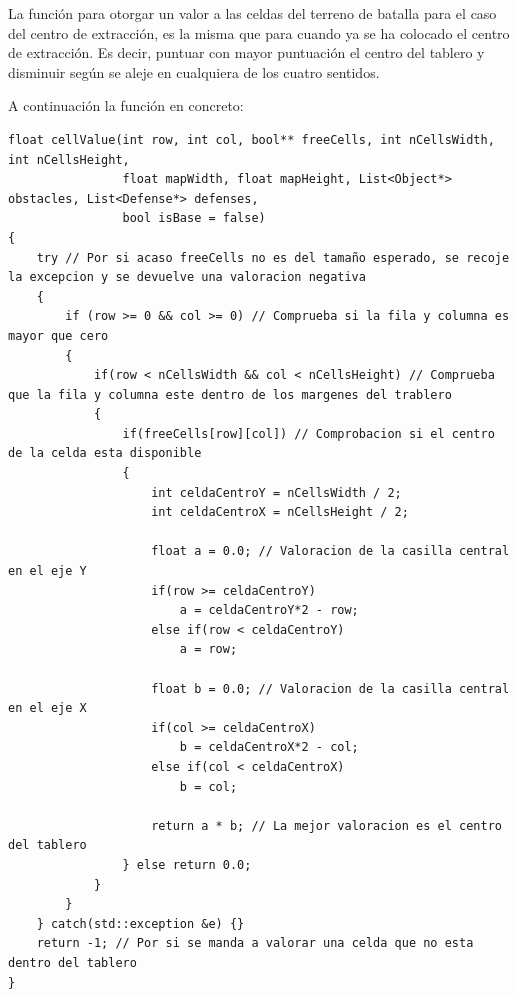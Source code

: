 \lstset{language=C++, texcl=true}

La función para otorgar un valor a las celdas del terreno de batalla
para el caso del centro de extracción, es la misma que para cuando ya
se ha colocado el centro de extracción. Es decir, puntuar con mayor
puntuación el centro del tablero y disminuir según se aleje en
cualquiera de los cuatro sentidos.

A continuación la función en concreto:

\begin{lstlisting}[frame=single]
float cellValue(int row, int col, bool** freeCells, int nCellsWidth, int nCellsHeight,
                float mapWidth, float mapHeight, List<Object*> obstacles, List<Defense*> defenses,
                bool isBase = false)
{
    try // Por si acaso freeCells no es del tamaño esperado, se recoje la excepcion y se devuelve una valoracion negativa
    {
        if (row >= 0 && col >= 0) // Comprueba si la fila y columna es mayor que cero
        {
            if(row < nCellsWidth && col < nCellsHeight) // Comprueba que la fila y columna este dentro de los margenes del trablero
            {
                if(freeCells[row][col]) // Comprobacion si el centro de la celda esta disponible
                {
                    int celdaCentroY = nCellsWidth / 2;
                    int celdaCentroX = nCellsHeight / 2;

                    float a = 0.0; // Valoracion de la casilla central en el eje Y
                    if(row >= celdaCentroY)
                        a = celdaCentroY*2 - row;
                    else if(row < celdaCentroY)
                        a = row;

                    float b = 0.0; // Valoracion de la casilla central en el eje X
                    if(col >= celdaCentroX)
                        b = celdaCentroX*2 - col;
                    else if(col < celdaCentroX)
                        b = col;

                    return a * b; // La mejor valoracion es el centro del tablero
                } else return 0.0;
            }
        }
    } catch(std::exception &e) {}
    return -1; // Por si se manda a valorar una celda que no esta dentro del tablero
}
\end{lstlisting}

